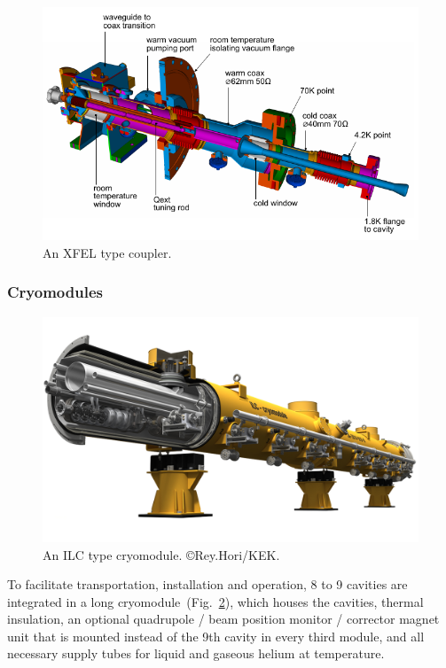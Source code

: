 \begin{figure}[htbp]
   \includegraphics[width=\hsize]{chapters/figures/xfelcoupler}
\caption{An XFEL type coupler.
}
\label{fig:xfelcoupler}
\end{figure}


\subsubsection{Cryomodules}

\begin{figure}[htbp]
   \includegraphics[width=\hsize]{chapters/figures/10_ILC_cryomodule}
\caption{An ILC type cryomodule. \copyright Rey.Hori/KEK.}
\label{fig:crymodule}
\end{figure}

To facilitate transportation, installation and operation, 8 to 9 cavities are integrated in a  long cryomodule~(Fig.~\ref{fig:crymodule}), which houses the cavities, thermal insulation, an optional quadrupole / beam position monitor / corrector magnet unit that is mounted instead of the 9th cavity in every third module, and all necessary supply tubes for liquid and gaseous helium at  temperature.


